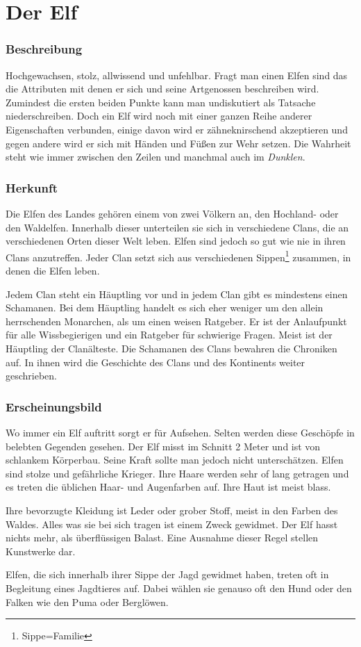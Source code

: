 \section{Der Elf}
\subsubsection{Beschreibung}
\par Hochgewachsen, stolz, allwissend und unfehlbar.
Fragt man einen Elfen sind das die Attributen mit denen er sich und
seine Artgenossen beschreiben wird. Zumindest die ersten beiden
Punkte kann man undiskutiert als Tatsache niederschreiben. Doch ein
Elf wird noch mit einer ganzen Reihe anderer Eigenschaften
verbunden, einige davon wird er zähneknirschend akzeptieren und
gegen andere wird er sich mit Händen und Füßen zur Wehr setzen.
Die Wahrheit steht wie immer zwischen den Zeilen und manchmal auch
im \textit{Dunklen}.
\subsubsection{Herkunft}
\par Die Elfen des Landes gehören einem von zwei Völkern an, den Hochland- oder den Waldelfen.
Innerhalb dieser unterteilen sie sich in verschiedene Clans, die an
verschiedenen Orten dieser Welt leben. Elfen sind jedoch so gut wie
nie in ihren Clans anzutreffen. Jeder Clan setzt sich aus
verschiedenen Sippen\footnote{Sippe=Familie} zusammen, in denen die
Elfen leben.
\par Jedem Clan steht ein Häuptling vor und in jedem Clan gibt
es mindestens einen Schamanen. Bei dem Häuptling handelt es sich
eher weniger um den allein herrschenden Monarchen, als um einen
weisen Ratgeber. Er ist der Anlaufpunkt für alle Wissbegierigen und
ein Ratgeber für schwierige Fragen. Meist ist der Häuptling der
Clanälteste. Die Schamanen des Clans bewahren die Chroniken auf. In
ihnen wird die Geschichte des Clans und des Kontinents weiter
geschrieben.
\subsubsection{Erscheinungsbild}
\par Wo immer ein Elf auftritt sorgt er für Aufsehen. Selten
werden diese Geschöpfe in belebten Gegenden gesehen. Der Elf misst
im Schnitt 2 Meter und ist von schlankem Körperbau. Seine Kraft
sollte man jedoch nicht unterschätzen. Elfen sind stolze und
gefährliche Krieger. Ihre Haare werden sehr of lang getragen und es
treten die üblichen Haar- und Augenfarben auf. Ihre Haut
ist meist blass.
\par Ihre bevorzugte Kleidung ist Leder oder grober Stoff,
meist in den Farben des Waldes. Alles was sie bei sich tragen ist
einem Zweck gewidmet. Der Elf hasst nichts mehr, als überflüssigen
Balast. Eine Ausnahme dieser Regel stellen Kunstwerke dar.
\par Elfen, die sich innerhalb ihrer Sippe der Jagd gewidmet haben, 
treten oft in Begleitung eines Jagdtieres auf. Dabei wählen sie genauso 
oft den Hund oder den Falken wie den Puma oder Berglöwen.
